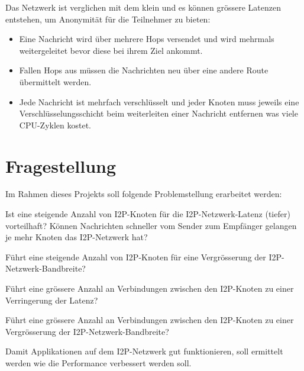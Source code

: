 Das Netzwerk ist verglichen mit dem  klein und es können grössere Latenzen entstehen, um Anonymität für die Teilnehmer zu bieten:

\begin{itemize}
    \item Eine Nachricht wird über mehrere Hops versendet und wird mehrmals weitergeleitet bevor diese bei ihrem Ziel ankommt.
    \item Fallen Hops aus müssen die Nachrichten neu über eine andere Route übermittelt werden.
    \item Jede Nachricht ist mehrfach verschlüsselt und jeder Knoten muss jeweils eine Verschlüsselungsschicht beim weiterleiten einer Nachricht entfernen was viele CPU-Zyklen kostet.
\end{itemize}


\section{Fragestellung}

Im Rahmen dieses Projekts soll folgende Problemstellung erarbeitet werden:

\begin{hyp} \label{hyp:first}
    Ist eine steigende Anzahl von I2P-Knoten für die I2P-Netzwerk-Latenz (tiefer) vorteilhaft?
    Können Nachrichten schneller vom Sender zum Empfänger gelangen je mehr Knoten das I2P-Netzwerk hat?
\end{hyp}

\begin{hyp} \label{hyp:second}
    Führt eine steigende Anzahl von I2P-Knoten für eine Vergrösserung der I2P-Netzwerk-Bandbreite?
\end{hyp}

\begin{hyp} \label{hyp:third}
    Führt eine grössere Anzahl an Verbindungen zwischen den I2P-Knoten zu einer Verringerung der Latenz?
\end{hyp}

\begin{hyp} \label{hyp:fourth}
    Führt eine grössere Anzahl an Verbindungen zwischen den I2P-Knoten zu einer Vergrösserung der I2P-Netzwerk-Bandbreite?
\end{hyp}

Damit Applikationen auf dem I2P-Netzwerk gut funktionieren, soll ermittelt werden wie die Performance
verbessert werden soll.

